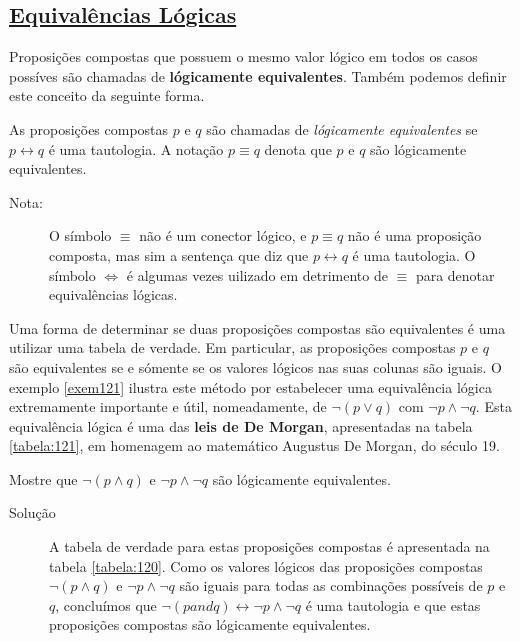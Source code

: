 \subsection*{\underline{Equivalências Lógicas}}

Proposições compostas que possuem o mesmo valor lógico em todos os casos
possíves são chamadas de \textbf{lógicamente equivalentes}. Também podemos
definir este conceito da seguinte forma.

\label{def18}
\begin{defn}
As proposições compostas $p$ e $q$ são chamadas de \emph{lógicamente
equivalentes} se $p \leftrightarrow q$ é uma tautologia. A notação $p \equiv q$
denota que $p$ e $q$ são lógicamente equivalentes.
\end{defn}

\begin{description}
\item[Nota:] O símbolo $\equiv$ não é um conector lógico, e $p \equiv q$ não é
uma proposição composta, mas sim a sentença que diz que $p \leftrightarrow q$ é
uma tautologia. O símbolo $\iff$ é algumas vezes uilizado em detrimento de
$\equiv$ para denotar equivalências lógicas.
\end{description}

Uma forma de determinar se duas proposições compostas são equivalentes é uma
utilizar uma tabela de verdade. Em particular, as proposições compostas $p$ e
$q$ são equivalentes se e sómente se os valores lógicos nas suas colunas são
iguais. O exemplo \ref{exem121} ilustra este método por estabelecer uma
equivalência lógica extremamente importante e útil, nomeadamente, de $\lnot
(p\lor q)$ com $\lnot p \land \lnot q$. Esta equivalência lógica é uma das
\textbf{leis de De Morgan}, apresentadas na tabela \ref{tabela:121}, em homenagem
ao matemático Augustus De Morgan, do século 19.


\begin{exmp}
\label{exem121}
Mostre que $\lnot (p \land q)$ e $\lnot p \land \lnot q$ são lógicamente
equivalentes.
\end{exmp}

\begin{description}
\item[Solução] A tabela de verdade para estas proposições compostas é
apresentada na tabela \ref{tabela:120}. Como os valores lógicos das proposições
compostas $\lnot (p \land q)$ e $\lnot p \land \lnot q$ são iguais para todas as
combinações possíveis de $p$ e $q$, concluímos que $\lnot (p and q)
\leftrightarrow \lnot p \land \lnot q$ é uma tautologia e que estas proposições
compostas são lógicamente equivalentes.
\end{description}

